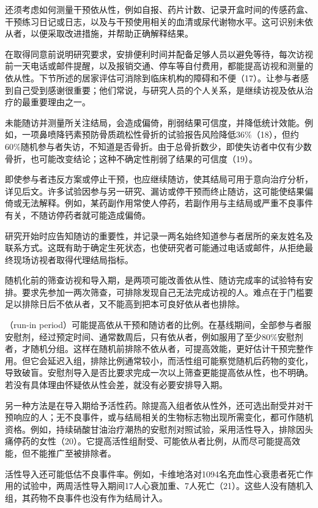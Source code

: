 还须考虑如何测量干预依从性，例如自报、药片计数、记录开盒时间的传感药盒、干预练习日记或日志，以及与干预使用相关的血清或尿代谢物水平。这可识别未依从者，以便采取改进措施，并帮助正确解释结果。

在取得同意前说明研究要求，安排便利时间并配备足够人员以避免等待，每次访视前一天电话或邮件提醒，以及报销交通、停车等自付费用，都能提高访视和测量的依从性。下节所述的居家评估可消除到临床机构的障碍和不便（17）。让参与者感到自己受到感谢很重要；他们常说，与研究人员的个人关系，是继续访视及依从治疗的最重要理由之一。

未能随访并测量所关注结局，会造成偏倚，削弱结果可信度，并降低统计效能。例如，一项鼻喷降钙素预防骨质疏松性骨折的试验报告风险降低36\%（18），但约60\%随机参与者失访，不知道是否骨折。由于总骨折数少，即使失访者中仅有少数骨折，也可能改变结论；这种不确定性削弱了结果的可信度（19）。

即使参与者违反方案或停止干预，也应继续随访，使其结局可用于意向治疗分析，详见后文。许多试验因参与另一研究、漏访或停干预而终止随访，这可能使结果偏倚或无法解释。例如，某药副作用常使人停药，若副作用与主结局或严重不良事件有关，不随访停药者就可能造成偏倚。

研究开始时应告知随访的重要性，并记录一两名始终知道参与者居所的亲友姓名及联系方式。这既有助于确定生死状态，也使研究者可能通过电话或邮件，从拒绝最终现场访视者取得代理结局指标。

随机化前的筛查访视和导入期，是两项可能改善依从性、随访完成率的试验特有安排。要求先参加一两次筛查，可排除发现自己无法完成访视的人。难点在于门槛要足以排除日后不依从者，又不能高到把本可良好依从者也排除。

（run-in period）可能提高依从干预和随访者的比例。在基线期间，全部参与者服安慰剂，经过预定时间、通常数周后，只有依从者，例如服用了至少80\%安慰剂者，才随机分组。这样在随机前排除不依从者，可提高效能，更好估计干预完整作用。但它会延迟入组，排除比例通常较小，而活性组可能察觉随机后药物的变化，导致破盲。安慰剂导入是否比要求完成一次以上筛查更能提高依从性，也不明确。若没有具体理由怀疑依从性会差，就没有必要安排导入期。

另一种方法是在导入期给予活性药。除提高入组者依从性外，还可选出耐受并对干预响应的人；无不良事件，或与结局相关的生物标志物出现所需变化，都可作随机资格。例如，持续硝酸甘油治疗潮热的安慰剂对照试验，采用活性导入，排除因头痛停药的女性（20）。它提高活性组耐受、可能依从者比例，从而尽可能提高效能，但不能推广至被排除者。

活性导入还可能低估不良事件率。例如，卡维地洛对1094名充血性心衰患者死亡作用的试验中，两周活性导入期间17人心衰加重、7人死亡（21）。这些人没有随机入组，其药物不良事件也没有作为结局计入。

